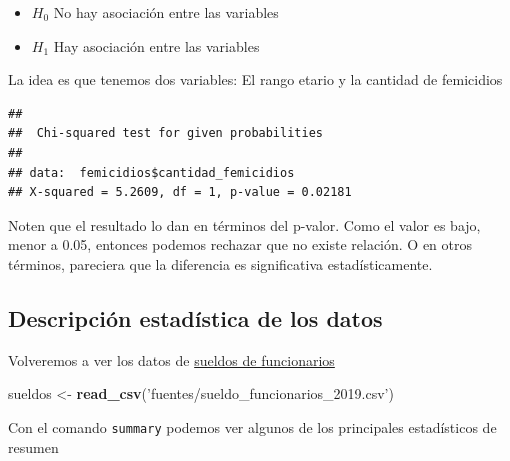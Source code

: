 \documentclass[]{book}
\newenvironment{Shaded}{\begin{snugshade}}{\end{snugshade}}
\newcommand{\KeywordTok}[1]{\textcolor[rgb]{0.13,0.29,0.53}{\textbf{#1}}}
\newcommand{\NormalTok}[1]{#1}
\newcommand{\OperatorTok}[1]{\textcolor[rgb]{0.81,0.36,0.00}{\textbf{#1}}}
\newcommand{\StringTok}[1]{\textcolor[rgb]{0.31,0.60,0.02}{#1}}
\providecommand{\tightlist}{%
  \setlength{\itemsep}{0pt}\setlength{\parskip}{0pt}}
\begin{document}
\begin{itemize}
\tightlist
\item
  \(H_0\) No hay asociación entre las variables
\item
  \(H_1\) Hay asociación entre las variables
\end{itemize}

La idea es que tenemos dos variables: El rango etario y la cantidad de femicidios

\begin{Shaded}
\end{Shaded}

\begin{verbatim}
## 
##  Chi-squared test for given probabilities
## 
## data:  femicidios$cantidad_femicidios
## X-squared = 5.2609, df = 1, p-value = 0.02181
\end{verbatim}

Noten que el resultado lo dan en términos del p-valor. Como el valor es bajo, menor a 0.05, entonces podemos rechazar que no existe relación. O en otros términos, pareciera que la diferencia es significativa estadísticamente.

\hypertarget{descripcion-estadistica-de-los-datos}{%
\subsection{Descripción estadística de los datos}\label{descripcion-estadistica-de-los-datos}}

Volveremos a ver los datos de \href{https://data.buenosaires.gob.ar/dataset/sueldo-funcionarios}{sueldos de funcionarios}

\begin{Shaded}
\begin{Highlighting}[]
\NormalTok{sueldos <-}\StringTok{ }\KeywordTok{read_csv}\NormalTok{(}\StringTok{'fuentes/sueldo_funcionarios_2019.csv'}\NormalTok{)}
\end{Highlighting}
\end{Shaded}

Con el comando \texttt{summary} podemos ver algunos de los principales estadísticos de resumen

\begin{Shaded}
\end{Shaded}
\end{document}
